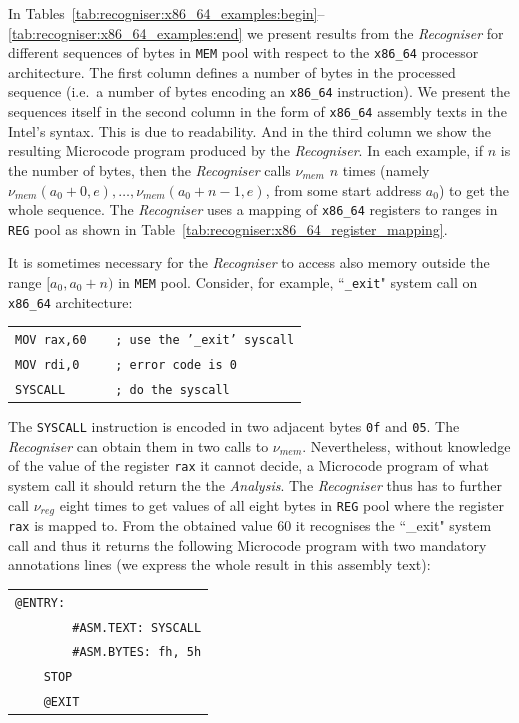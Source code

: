 \documentclass[10pt,twocolumn]{article}
\begin{document}
In Tables~\ref{tab:recogniser:x86_64_examples:begin}--\ref{tab:recogniser:x86_64_examples:end}
we present results from the \emph{Recogniser} for different sequences of bytes
in \texttt{MEM} pool with respect to the \texttt{x86\_64} processor
architecture. The first column defines a number of bytes in the processed
sequence (i.e.~a number of bytes encoding an \texttt{x86\_64} instruction). We
present the sequences itself in the second column in the form of
\texttt{x86\_64} assembly texts in the Intel's syntax. This is due to
readability. And in the third column we show the resulting Microcode program
produced by the \emph{Recogniser}.  In each example, if $ n $ is the number of
bytes, then the \emph{Recogniser} calls $ \nu_\mathit{mem} $ $ n $ times (namely
$ \nu_\mathit{mem}(a_0+0,e), \ldots, \nu_\mathit{mem}(a_0+n-1,e) $, from some
start address $ a_0 $) to get the whole sequence. The \emph{Recogniser} uses a
mapping of \texttt{x86\_64} registers to ranges in \texttt{REG} pool as shown in
Table~\ref{tab:recogniser:x86_64_register_mapping}.

It is sometimes necessary for the \emph{Recogniser} to access also memory outside the range $ [a_0,a_0+n) $ in \texttt{MEM} pool. Consider, for example, ``\texttt{\_exit}" system call on \texttt{x86\_64} architecture:
\begin{center}
\begin{tabular}{l}
\texttt{MOV rax,60~~~~; use the '\_exit' syscall}\\
\texttt{MOV rdi,0~~~~~; error code is 0}\\
\texttt{SYSCALL~~~~~~~; do the syscall}\\
\end{tabular}
\end{center}

The \texttt{SYSCALL} instruction is encoded in two adjacent bytes \texttt{0f}
and \texttt{05}. The \emph{Recogniser} can obtain them in two calls to $
\nu_\mathit{mem} $. Nevertheless, without knowledge of the value of the register
\texttt{rax} it cannot decide, a Microcode program of what system call it should
return the the \emph{Analysis}. The \emph{Recogniser} thus has to further call $
\nu_\mathit{reg} $ eight times to get values of all eight bytes in \texttt{REG}
pool where the register \texttt{rax} is mapped to. From the obtained value 60 it
recognises the ``\_exit" system call and thus it returns the following Microcode
program with two mandatory annotations lines (we express the whole result in
this assembly text):
\begin{center}
\begin{tabular}{l}
\texttt{@ENTRY:}\\
\texttt{~~~~~~~~\#ASM.TEXT: SYSCALL}\\
\texttt{~~~~~~~~\#ASM.BYTES: fh, 5h}\\
\texttt{~~~~STOP}\\
\texttt{~~~~@EXIT}\\
\end{tabular}
\end{center}
\end{document}
